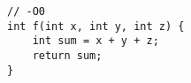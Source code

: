 \begin{lstlisting}[title=\href{https://godbolt.org/z/5wXMGr}{\texttt{godbolt.org/z/5wXMGr}}]
// -O0
int f(int x, int y, int z) {
    int sum = x + y + z;
    return sum;
}
\end{lstlisting}
